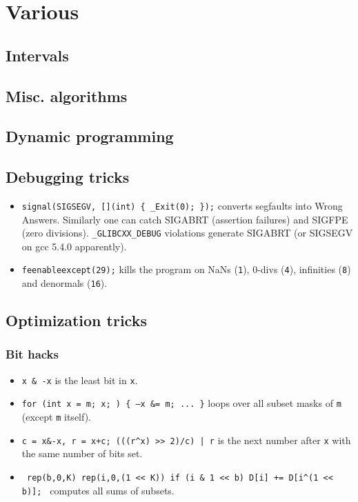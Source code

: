 \chapter{Various}

\section{Intervals}

\section{Misc. algorithms}
	\columnbreak
	\newpage

\section{Dynamic programming}

\section{Debugging tricks}
	\begin{itemize}
		\item \texttt{signal(SIGSEGV, [](int) \{ \_Exit(0); \});} converts segfaults into Wrong Answers.
			Similarly one can catch SIGABRT (assertion failures) and SIGFPE (zero divisions).
			\texttt{\_GLIBCXX\_DEBUG} violations generate SIGABRT (or SIGSEGV on gcc 5.4.0 apparently).
		\item \texttt{feenableexcept(29);} kills the program on NaNs (\texttt 1), 0-divs (\texttt 4), infinities (\texttt 8) and denormals (\texttt{16}).
	\end{itemize}

\section{Optimization tricks}
	\subsection{Bit hacks}
		\begin{itemize}
			\item \texttt{x \& -x} is the least bit in \texttt{x}.
			\item \texttt{for (int x = m; x; ) \{ --x \&= m; ... \}} loops over all subset masks of \texttt{m} (except \texttt{m} itself).
			\item \texttt{c = x\&-x, r = x+c; (((r\^{}x) >> 2)/c) | r} is the next number after \texttt{x} with the same number of bits set.
			\item \texttt{ rep(b,0,K) rep(i,0,(1 << K)) if (i \& 1 << b) D[i] += D[i\^{}(1 << b)]; } computes all sums of subsets.
		\end{itemize}
